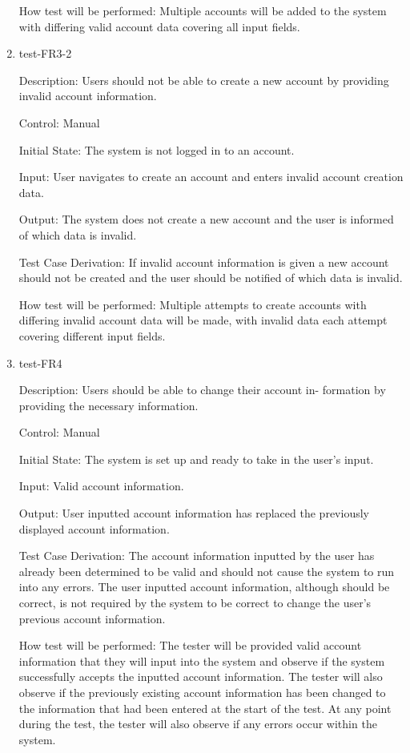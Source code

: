 \documentclass[12pt, titlepage]{article}
\begin{document}
\begin{enumerate}
  How test will be performed: Multiple accounts will be added to the system
  with differing valid account data covering all input fields.

  \item{test-FR3-2\\}
  
  Description: Users should not be able to create a new account by
  providing invalid account information.

  Control: Manual

  Initial State: The system is not logged in to an account.

  Input: User navigates to create an account and enters invalid account
  creation data.

  Output: The system does not create a new account and the user is informed of
  which data is invalid.

  Test Case Derivation: If invalid account information is given a new account
  should not be created and the user should be notified of which data is
  invalid.

  How test will be performed: Multiple attempts to create accounts with
  differing invalid account data will be made, with invalid data each attempt
  covering different input fields.

  \item{test-FR4\\}
  
  Description: Users should be able to change their account in-
  formation by providing the necessary information.

  Control: Manual

  Initial State: The system is set up and ready to take in the user's input.

  Input: Valid account information.

  Output: User inputted account information has replaced the previously displayed
  account information.

  Test Case Derivation: The account information inputted by the user has already been
  determined to be valid and should not cause the system to run into any errors. The
  user inputted account information, although should be correct, is not required by
  the system to be correct to change the user's previous account information.

  How test will be performed: The tester will be provided valid account information
  that they will input into the system and observe if the system successfully
  accepts the inputted account information. The tester will also observe if the previously
  existing account information has been changed to the information that had been entered
  at the start of the test. At any point during the test, the tester will also observe if
  any errors occur within the system.


\end{enumerate}
\end{document}
